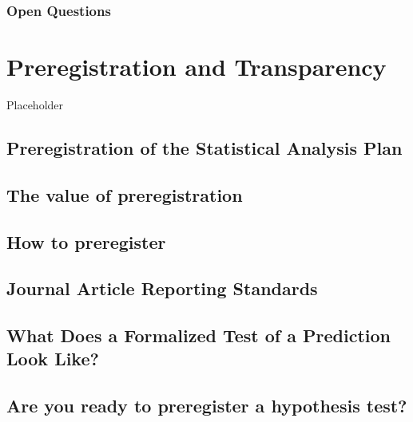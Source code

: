 \documentclass[
  oneside]{krantz}
\begin{document}
\hypertarget{open-questions-10}{%
\subsubsection{Open Questions}\label{open-questions-10}}

\hypertarget{prereg}{%
\section{Preregistration and Transparency}\label{prereg}}

Placeholder

\hypertarget{preregistration-of-the-statistical-analysis-plan}{%
\subsection{Preregistration of the Statistical Analysis
Plan}\label{preregistration-of-the-statistical-analysis-plan}}

\hypertarget{the-value-of-preregistration}{%
\subsection{The value of
preregistration}\label{the-value-of-preregistration}}

\hypertarget{how-to-preregister}{%
\subsection{How to preregister}\label{how-to-preregister}}

\hypertarget{journal-article-reporting-standards}{%
\subsection{Journal Article Reporting
Standards}\label{journal-article-reporting-standards}}

\hypertarget{what-does-a-formalized-test-of-a-prediction-look-like}{%
\subsection{What Does a Formalized Test of a Prediction Look
Like?}\label{what-does-a-formalized-test-of-a-prediction-look-like}}

\hypertarget{are-you-ready-to-preregister-a-hypothesis-test}{%
\subsection{Are you ready to preregister a hypothesis
test?}\label{are-you-ready-to-preregister-a-hypothesis-test}}
\end{document}
